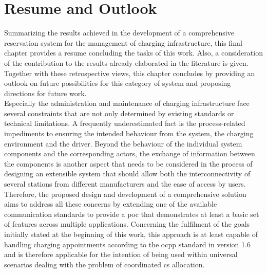 

\chapter{Resume and Outlook}
\label{ch:Resume and Outlook}

Summarizing the results achieved in the development of a comprehensive reservation system for the management of charging infrastructure, this final chapter provides a resume concluding the tasks of this work. Also, a consideration of the contribution to the results already elaborated in the literature is given. Together with these retrospective views, this chapter concludes by providing an outlook on future possibilities for this category of system and proposing directions for future work. \\
\noindent Especially the administration and maintenance of charging infrastructure face several constraints that are not only determined by existing standards or technical limitations. A frequently underestimated fact is the process-related impediments to ensuring the intended behaviour from the system, the charging environment and the driver.
Beyond the behaviour of the individual system components and the corresponding actors, the exchange of information between the components is another aspect that needs to be considered in the process of designing an extensible system that should allow both the interconnectivity of several stations from different manufacturers and the ease of access by users.
Therefore, the proposed design and development of a comprehensive solution aims to address all these concerns by extending one of the available communication standards to provide a \acrshort{poc} that demonstrates at least a basic set of features across multiple applications.
Concerning the fulfilment of the goals initially stated at the beginning of this work, this approach is at least capable of handling charging appointments according to the \acrshort{ocpp} standard in version 1.6 and is therefore applicable for the intention of being used within universal scenarios dealing with the problem of coordinated \acrshort{cs} allocation. 
